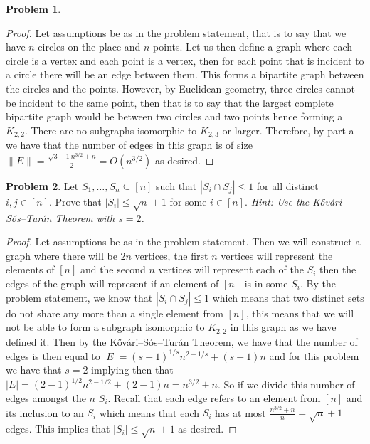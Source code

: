 \documentclass[11pt, letter]{amsart}
\theoremstyle{definition}
\newtheorem{problem}{Problem}[]
\begin{document}
\begin{problem}
\begin{enumerate}[label=(\alph*)]
\begin{proof}
    Let assumptions be as in the problem statement, that is to say that we have $n$ circles on the place and $n$ points. Let us then define a graph where each circle is a vertex and each point is a vertex, then for each point that is incident to a circle there will be an edge between them. This forms a bipartite graph between the circles and the points. However, by Euclidean geometry, three circles cannot be incident to the same point, then that is to say that the largest complete bipartite graph would be between two circles and two points hence forming a $K_{2, 2}$. There are no subgraphs isomorphic to $K_{2, 3}$ or larger. Therefore, by part a we have that the number of edges in this graph is of size $\|E\| = \frac{\sqrt{3 - 1}n^{3/2} + n}{2} = O(n^{3/2})$ as desired.
\end{proof}
  
  \end{enumerate}
\end{problem}

\clearpage
\begin{problem}
  Let $S_1, \dots, S_n \subseteq [n]$ such that $|S_i \cap S_j| \leq 1$ for all distinct $i, j \in [n]$.  Prove that $|S_i| \leq \sqrt n + 1$ for some $i \in [n]$.  \textit{Hint: Use the K\H{o}v\'ari--S\'os--Tur\'an Theorem with $s = 2$.}
\end{problem}

\begin{proof}
    Let assumptions be as in the problem statement. Then we will construct a graph where there will be $2n$ vertices, the first $n$ vertices will represent the elements of $\left[n\right]$ and the second $n$ vertices will represent each of the $S_i$ then the edges of the graph will represent if an element of $\left[n\right]$ is in some $S_i$. By the problem statement, we know that $\left|S_i\cap S_j\right| \leq 1$ which means that two distinct sets do not share any more than a single element from $\left[n\right]$, this means that we will not be able to form a subgraph isomorphic to $K_{2,2}$ in this graph as we have defined it. Then by the K\H{o}v\'ari--S\'os--Tur\'an Theorem, we have that the number of edges is then equal to $\left|E\right| = \left(s - 1\right)^{1/s}n^{2-1/s} + \left(s - 1\right)n$ and for this problem we have that $s = 2$ implying then that $\left|E\right| = \left(2 - 1\right)^{1/2}n^{2 - 1/2} + \left(2 - 1\right)n = n^{3/2} + n$. So if we divide this number of edges amongst the $n$ $S_i$. Recall that each edge refers to an element from $\left[n\right]$ and its inclusion to an $S_i$ which means that each $S_i$ has at most $\frac{n^{3/2} + n}{n} = \sqrt{n} + 1$ edges. This implies that $\left|S_i\right| \leq \sqrt{n} + 1$ as desired.
\end{proof}
\end{document}
